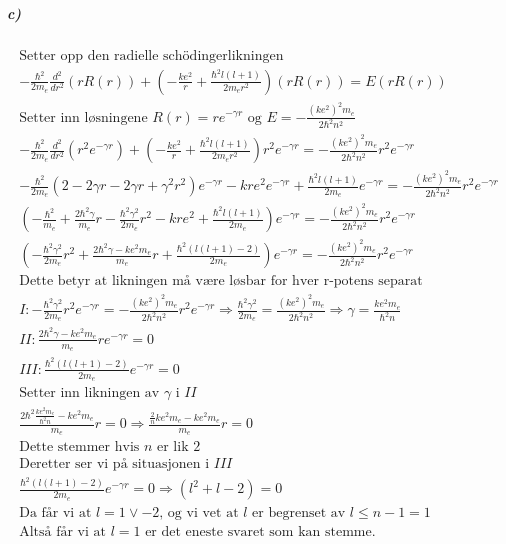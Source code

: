 \documentclass[11pt, A4paper,norsk]{article}
\begin{document}
			\subparagraph{c)}
				\begin{gather*}
\text{Setter opp den radielle schödingerlikningen} \\
- \frac{\hbar^2}{2 m_e} \frac{d^2}{dr^2} \left( r R(r) \right) + \left( - \frac{k e^2}{r} + \frac{\hbar^2 l (l + 1)}{2 m_e r^2} \right) \left( r R(r) \right) = E \left( r R(r) \right) \\
\text{Setter inn løsningene $R(r) = r e^{- \gamma r}$ og $E = - \frac{(ke^2)^2 m_e}{2 \hbar^2 n^2}$} \\
- \frac{\hbar^2}{2 m_e} \frac{d^2}{dr^2} \left( r^2 e^{- \gamma r} \right) + \left( - \frac{k e^2}{r} + \frac{\hbar^2 l (l + 1)}{2 m_e r^2} \right) r^2 e^{- \gamma r} = - \frac{(ke^2)^2 m_e}{2 \hbar^2 n^2} r^2 e^{- \gamma r} \\
- \frac{\hbar^2}{2 m_e} \left( 2 - 2 \gamma r - 2 \gamma r + \gamma^2 r^2 \right) e^{- \gamma r} - k r e^2 e^{- \gamma r} + \frac{\hbar^2 l (l + 1)}{2 m_e} e^{- \gamma r} = - \frac{(ke^2)^2 m_e}{2 \hbar^2 n^2} r^2 e^{- \gamma r} \\
\left( - \frac{\hbar^2}{m_e} + \frac{2 \hbar^2 \gamma}{m_e} r - \frac{\hbar^2 \gamma^2}{2 m_e} r^2 - k r e^2 + \frac{\hbar^2 l (l + 1)}{2 m_e} \right) e^{- \gamma r} = - \frac{(ke^2)^2 m_e}{2 \hbar^2 n^2} r^2 e^{- \gamma r} \\
\left( - \frac{\hbar^2 \gamma^2}{2 m_e} r^2 + \frac{2 \hbar^2 \gamma - k e^2 m_e}{m_e} r + \frac{\hbar^2 (l (l + 1) - 2)}{2 m_e} \right) e^{- \gamma r} = - \frac{(ke^2)^2 m_e}{2 \hbar^2 n^2} r^2 e^{- \gamma r} \\
\text{Dette betyr at likningen må være løsbar for hver r-potens separat} \\
I : - \frac{\hbar^2 \gamma^2}{2 m_e} r^2 e^{- \gamma r} = - \frac{(ke^2)^2 m_e}{2 \hbar^2 n^2} r^2 e^{- \gamma r} \Rightarrow \frac{\hbar^2 \gamma^2}{2 m_e} = \frac{(ke^2)^2 m_e}{2 \hbar^2 n^2} \Rightarrow \gamma = \frac{ke^2 m_e}{\hbar^2 n} \\
II : \frac{2 \hbar^2 \gamma - k e^2 m_e}{m_e} r e^{- \gamma r} = 0 \\
III : \frac{\hbar^2 (l (l + 1) - 2)}{2 m_e} e^{- \gamma r} = 0 \\
\text{Setter inn likningen av $\gamma$ i $II$} \\
\frac{2 \hbar^2 \frac{ke^2 m_e}{\hbar^2 n} - k e^2 m_e}{m_e} r = 0 \Rightarrow \frac{\frac{2}{n} ke^2 m_e - k e^2 m_e}{m_e} r = 0 \\
\text{Dette stemmer hvis $n$ er lik $2$} \\
\text{Deretter ser vi på situasjonen i $III$} \\
\frac{\hbar^2 (l (l + 1) - 2)}{2 m_e} e^{- \gamma r} = 0 \Rightarrow (l^2 + l - 2) = 0 \\
\text{Da får vi at $l = 1 \vee -2$, og vi vet at $l$ er begrenset av $l \leq n - 1 = 1$} \\
\text{Altså får vi at $l = 1$ er det eneste svaret som kan stemme.}
				\end{gather*}
			
\end{document}
